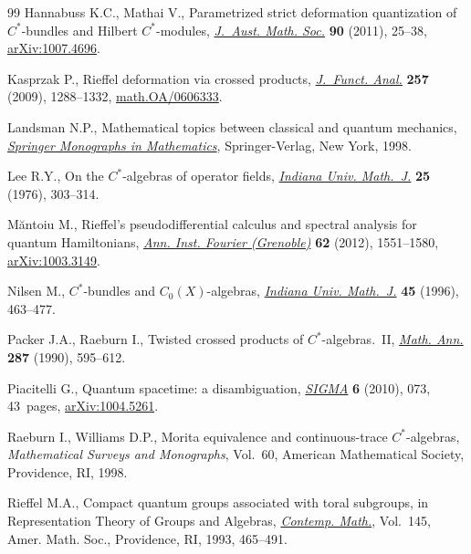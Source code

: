 \documentclass[pdftex]{sigma}
\begin{document}
\begin{thebibliography}{99}
Hannabuss K.C., Mathai V., Parametrized strict deformation quantization of
  {$C^*$}-bundles and {H}ilbert {$C^*$}-modules, \href{http://dx.doi.org/10.1017/S1446788711001170}{\textit{J.~Aust. Math. Soc.}}
  \textbf{90} (2011), 25--38, \href{http://arxiv.org/abs/1007.4696}{arXiv:1007.4696}.

Kasprzak P., Rief\/fel deformation via crossed products, \href{http://dx.doi.org/10.1016/j.jfa.2009.05.013}{\textit{J.~Funct. Anal.}}
  \textbf{257} (2009), 1288--1332, \href{http://arxiv.org/abs/math.OA/0606333}{math.OA/0606333}.

Landsman N.P., Mathematical topics between classical and quantum mechanics,
  \href{http://dx.doi.org/10.1007/978-1-4612-1680-3}{\textit{Springer Monographs in Mathematics}}, Springer-Verlag, New York, 1998.

Lee R.Y., On the {$C^*$}-algebras of operator f\/ields, \href{http://dx.doi.org/10.1512/iumj.1976.25.25026}{\textit{Indiana Univ.
  Math.~J.}} \textbf{25} (1976), 303--314.

M\u{a}ntoiu M., Rief\/fel's pseudodif\/ferential calculus and spectral analysis for
  quantum Hamiltonians, \href{http://dx.doi.org/10.5802/aif.2729}{\textit{Ann. Inst. Fourier (Grenoble)}} \textbf{62}
  (2012), 1551--1580, \href{http://arxiv.org/abs/1003.3149}{arXiv:1003.3149}.

Nilsen M., $C^*$-bundles and {$C_0(X)$}-algebras, \href{http://dx.doi.org/10.1512/iumj.1996.45.1086}{\textit{Indiana Univ.
  Math.~J.}} \textbf{45} (1996), 463--477.

Packer J.A., Raeburn I., Twisted crossed products of {$C^*$}-algebras.~{II},
  \href{http://dx.doi.org/10.1007/BF01446916}{\textit{Math. Ann.}} \textbf{287} (1990), 595--612.

Piacitelli G., Quantum spacetime: a disambiguation, \href{http://dx.doi.org/10.3842/SIGMA.2010.073}{\textit{SIGMA}} \textbf{6}
  (2010), 073, 43~pages, \href{http://arxiv.org/abs/1004.5261}{arXiv:1004.5261}.

Raeburn I., Williams D.P., Morita equivalence and continuous-trace
  {$C^*$}-algebras, \textit{Mathematical Surveys and Monographs}, Vol.~60,
  American Mathematical Society, Providence, RI, 1998.



Rief\/fel M.A., Compact quantum groups associated with toral subgroups, in
  Representation Theory of Groups and Algebras, \href{http://dx.doi.org/10.1090/conm/145/1216204}{\textit{Contemp. Math.}}, Vol.~145, Amer. Math. Soc., Providence, RI, 1993, 465--491.


\end{thebibliography}
\end{document}
